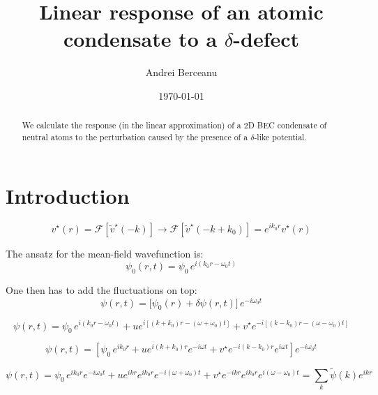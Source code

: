 \documentclass[a4paper,prb,10pt,aps]{revtex4-1}
\begin{document}
\title{Linear response of an atomic condensate to a $\delta$-defect}
\author{Andrei Berceanu}

\date{\today}

\begin{abstract}
We calculate the response (in the linear approximation) of a 2D BEC condensate of neutral atoms to the perturbation caused by the presence of a $\delta$-like potential.
\end{abstract}


\section{Introduction}

\begin{equation}
  \label{eq:1}
v^{\star}(r)=\mathcal{F}[\widetilde{v}^{\star}(-k)]\rightarrow\mathcal{F}[\tilde{v}^{\star}(-k+k_{0})]=e^{ik_{0}r}v^{\star}(r)
\end{equation}


The ansatz for the mean-field wavefunction is:
\begin{equation}
  \label{eq:2}
\psi_{0}(r,t)=\psi_{0}\, e^{i(k_{0}r-\omega_{0}t)}
\end{equation}


One then has to add the fluctuations on top:
\begin{equation}
  \label{eq:3}
\psi(r,t)=\big[\psi_{0}(r)+\delta\psi(r,t)\big]\, e^{-i\omega_{0}t}
\end{equation}


\begin{equation}
  \label{eq:4}
\psi(r,t)=\psi_{0}\, e^{i(k_{0}r-\omega_{0}t)}+ue^{i[(k+k_{0})r-(\omega+\omega_{0})t]}+v^{\star}e^{-i[(k-k_{0})r-(\omega-\omega_{0})t]}
\end{equation}



\begin{equation}
  \label{eq:5}
\psi(r,t)=\left[\psi_{0}\, e^{ik_{0}r}+ue^{i(k+k_{0})r}e^{-i\omega t}+v^{\star}e^{-i(k-k_{0})r}e^{i\omega t}\right]e^{-i\omega_{0}t}
\end{equation}


\begin{equation}
  \label{eq:6}
\psi(r,t)=\psi_{0}\, e^{ik_{0}r}e^{-i\omega_{0}t}+ue^{ikr}e^{ik_{0}r}e^{-i(\omega+\omega_{0})t}+v^{\star}e^{-ikr}e^{ik_{0}r}e^{i(\omega-\omega_{0})t}=\sum_{k}\widetilde{\psi}(k)e^{ikr}
\end{equation}
\end{document}
